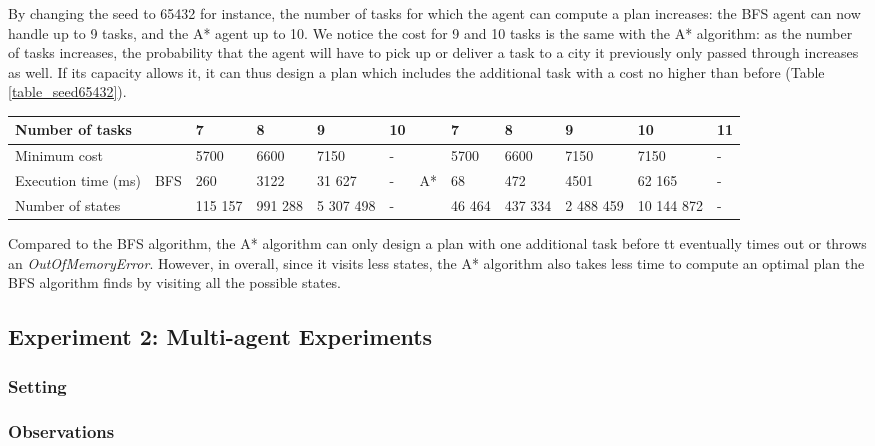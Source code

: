 \documentclass[10pt]{article}
\begin{document}
\noindent
By changing the seed to 65432 for instance, the number of tasks for which the agent can compute a plan increases: the BFS agent can now handle up to 9 tasks, and the A* agent up to 10. We notice the cost for 9 and 10 tasks is the same with the A* algorithm: as the number of tasks increases, the probability that the agent will have to pick up or deliver a task to a city it previously only passed through increases as well. If its capacity allows it, it can thus design a plan which includes the additional task with a cost no higher than before (Table \ref{table_seed65432}).\\
\begin{adjustwidth}{0cm}{}
\begin{tabular}{|l|lllll|llllll|}
\hline
Number of tasks & & 7 & 8 & 9 & 10 & & 7 & 8 & 9 & 10 & 11\\
\hline
Minimum cost & & 5700 & 6600 & 7150 & - & & 5700 & 6600 & 7150 & 7150 & -\\
Execution time (ms) & BFS & 260 & 3122 & 31 627 & - & A* & 68 & 472 & 4501 & 62 165 & -\\
Number of states & & 115 157 & 991 288 & 5 307 498 & - & & 46 464 & 437 334 & 2 488 459 & 10 144 872 & -\\
\hline
\end{tabular}
\label{table_seed65432}
\end{adjustwidth}
\vspace{4mm}

\noindent
Compared to the BFS algorithm, the A* algorithm can only design a plan with one additional task before tt eventually times out or throws an \textit{OutOfMemoryError}.
However, in overall, since it visits less states, the A* algorithm also takes less time to compute an optimal plan the BFS algorithm finds by visiting all the possible states.

\subsection{Experiment 2: Multi-agent Experiments}

\subsubsection{Setting}

\subsubsection{Observations}
\end{document}

